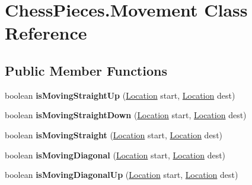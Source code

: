 \hypertarget{class_chess_pieces_1_1_movement}{}\section{Chess\+Pieces.\+Movement Class Reference}
\label{class_chess_pieces_1_1_movement}
\subsection*{Public Member Functions}
\begin{DoxyCompactItemize}
\item 
boolean {\bfseries is\+Moving\+Straight\+Up} (\hyperlink{class_chess_pieces_1_1_location}{Location} start, \hyperlink{class_chess_pieces_1_1_location}{Location} dest)\hypertarget{class_chess_pieces_1_1_movement_aa316afd9aa13298ab2e80446135f5ede}{}\label{class_chess_pieces_1_1_movement_aa316afd9aa13298ab2e80446135f5ede}

\item 
boolean {\bfseries is\+Moving\+Straight\+Down} (\hyperlink{class_chess_pieces_1_1_location}{Location} start, \hyperlink{class_chess_pieces_1_1_location}{Location} dest)\hypertarget{class_chess_pieces_1_1_movement_a8b1cc5769379835073dc43c7d3666865}{}\label{class_chess_pieces_1_1_movement_a8b1cc5769379835073dc43c7d3666865}

\item 
boolean {\bfseries is\+Moving\+Straight} (\hyperlink{class_chess_pieces_1_1_location}{Location} start, \hyperlink{class_chess_pieces_1_1_location}{Location} dest)\hypertarget{class_chess_pieces_1_1_movement_aba8f66929b1a284a332f66314c8ab52d}{}\label{class_chess_pieces_1_1_movement_aba8f66929b1a284a332f66314c8ab52d}

\item 
boolean {\bfseries is\+Moving\+Diagonal} (\hyperlink{class_chess_pieces_1_1_location}{Location} start, \hyperlink{class_chess_pieces_1_1_location}{Location} dest)\hypertarget{class_chess_pieces_1_1_movement_accfead9a46eb0d877c526c3fbcbbbd73}{}\label{class_chess_pieces_1_1_movement_accfead9a46eb0d877c526c3fbcbbbd73}

\item 
boolean {\bfseries is\+Moving\+Diagonal\+Up} (\hyperlink{class_chess_pieces_1_1_location}{Location} start, \hyperlink{class_chess_pieces_1_1_location}{Location} dest)\hypertarget{class_chess_pieces_1_1_movement_ab1cad4261ce14fbb288bb50769a8ea87}{}\label{class_chess_pieces_1_1_movement_ab1cad4261ce14fbb288bb50769a8ea87}


\end{DoxyCompactItemize}

